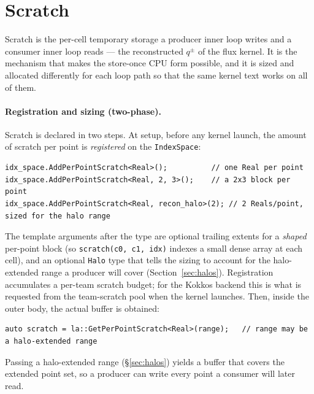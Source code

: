 \documentclass[11pt]{article}
\newcommand{\code}[1]{\lstinline[basicstyle=\ttfamily]|#1|}
\begin{document}
\section{Scratch}
\label{sec:scratch}

Scratch is the per-cell temporary storage a producer inner loop writes and a
consumer inner loop reads --- the reconstructed $q^\pm$ of the flux kernel. It is
the mechanism that makes the store-once CPU form possible, and it is sized
and allocated differently for each loop path so that the same kernel text works on
all of them.

\paragraph{Registration and sizing (two-phase).} Scratch is declared in two steps.
At setup, before any kernel launch, the amount of scratch per point is
\emph{registered} on the \code{IndexSpace}:
\begin{lstlisting}
idx_space.AddPerPointScratch<Real>();          // one Real per point
idx_space.AddPerPointScratch<Real, 2, 3>();    // a 2x3 block per point
idx_space.AddPerPointScratch<Real, recon_halo>(2); // 2 Reals/point, sized for the halo range
\end{lstlisting}
The template arguments after the type are optional trailing extents for a
\emph{shaped} per-point block (so \code{scratch(c0, c1, idx)} indexes a small dense
array at each cell), and an optional \code{Halo} type that tells the sizing to
account for the halo-extended range a producer will cover
(Section~\ref{sec:halos}). Registration accumulates a per-team scratch budget;
for the Kokkos backend this is what is requested from the team-scratch pool when
the kernel launches. Then, inside the outer body, the actual buffer is obtained:
\begin{lstlisting}
auto scratch = la::GetPerPointScratch<Real>(range);   // range may be a halo-extended range
\end{lstlisting}
Passing a halo-extended range (\S\ref{sec:halos}) yields a buffer that covers the
extended point set, so a producer can write every point a consumer will later
read.
\end{document}
